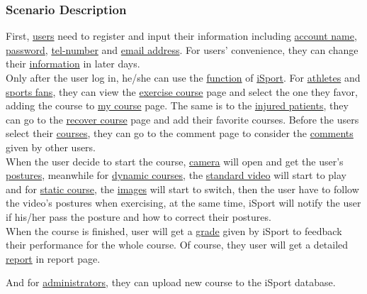 \documentclass[16pt]{scrreprt}
\begin{document}
\subsubsection{Scenario Description}
First, \underline{users} need to register and input their information including \underline{account name}, \underline{password}, \underline{tel-number} and \underline{email address}. For users’ convenience, they can change their \underline{information} in later days.\\
\noindent Only after the user log in, he/she can use the \underline{function} of \underline{iSport}. For \underline{athletes} and \underline{sports fans}, they can view the \underline{exercise course} page and select the one they favor, adding the course to \underline{my course} page. The same is to the \underline{injured patients}, they can go to the \underline{recover course} page and add their favorite courses. Before the users select their \underline{courses}, they can go to the comment page to consider the \underline{comments} given by other users. \\
\noindent When the user decide to start the course, \underline{camera} will open and get the user’s \underline{postures}, meanwhile for \underline{dynamic courses}, the \underline{standard video} will start to play and for \underline{static course}, the \underline{images} will start to switch, then the user have to follow the video’s postures when exercising, at the same time, iSport will notify the user if his/her pass the posture and how to correct their postures. \\
\noindent When the course is finished, user will get a \underline{grade} given by iSport to feedback their performance for the whole course. Of course, they user will get a detailed \underline{report} in report page.

\noindent And for \underline{administrators}, they can upload new course to the iSport database.
\end{document}

